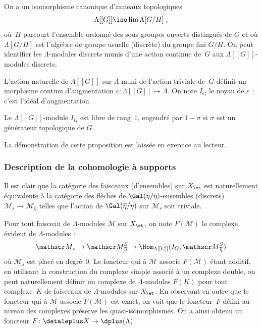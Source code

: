 \documentclass[10pt]{../fichiers-configuration-latex/smfart}
\begin{document}
On a un isomorphisme canonique d'anneaux topologiques
\[\Lambda[[G]]\iso \lim \Lambda[G/H]\;\text{,}\]
où $H$ parcourt l'ensemble ordonné des sous-groupes ouverts distingués de
$G$ et où $\Lambda[G/H]$ est l'algèbre de groupe usuelle (discrète)
du groupe fini
$G/H$. On peut identifier les $\Lambda$-modules discrets munis d'une action
continue de $G$ aux $\Lambda[[G]]$-modules discrets.

L'action naturelle de $\Lambda[[G]]$ sur $\Lambda$ muni de l'action
triviale de $G$ définit un morphisme continu d'augmentation
$\varepsilon\colon\Lambda[[G]]\to \Lambda$. On note $I_G$ le noyau de
$\varepsilon$ : c'est l'idéal d'augmentation.

\begin{proposition3}\label{17-proposition-structure-i-g}
Le $\Lambda[[G]]$-module $I_G$ est libre de rang $1$, engendré par
$1-\sigma$ si $\sigma$ est un générateur topologique de $G$.
\end{proposition3}

La démonstration de cette proposition est laissée en exercice au lecteur.

\subsubsection{Description de la cohomologie à supports}%

Il est clair que la catégorie des faisceaux (d'ensembles) sur $X_\et$ est
naturellement équivalente à la catégorie des flèches de $\Gal(\overline
\eta/\eta)$-ensembles (discrets) ${\mathscr M}_s\to 
{\mathscr M}_{\overline \eta}$ telles que 
l'action de $\Gal(\overline \eta/\eta)$ sur ${\mathscr M}_s$ soit triviale.

Pour tout faisceau de $\Lambda$-modules $\mathscr M$ sur $X_\et$, on note
$F(\mathscr M)$ le complexe évident de $\Lambda$-modules :
\[{\mathscr M}_s\to {\mathscr M}_{\overline \eta}^S\to
\Hom_{\Lambda[[G]]}(I_G,{\mathscr M}_{\overline \eta}^S)\]
où ${\mathscr M}_s$ est placé en degré $0$. Le foncteur qui à $\mathscr M$
associe $F(\mathscr M)$ étant additif, en utilisant la construction du
complexe simple associé à un complexe double, on peut naturellement définir
un complexe de $\Lambda$-modules $F(K)$  pour tout complexe $K$ de
faisceaux de $\Lambda$-modules sur $X_\et$. En observant en outre que le
foncteur qui à $\mathscr M$ associe $F(\mathscr M)$ est exact, on voit que 
le foncteur $F$ défini au niveau des complexes préserve les
quasi-isomorphismes. On a ainsi obtenu un foncteur $F\colon \detaleplus X\to
\dplus(\Lambda)$.
\end{document}
